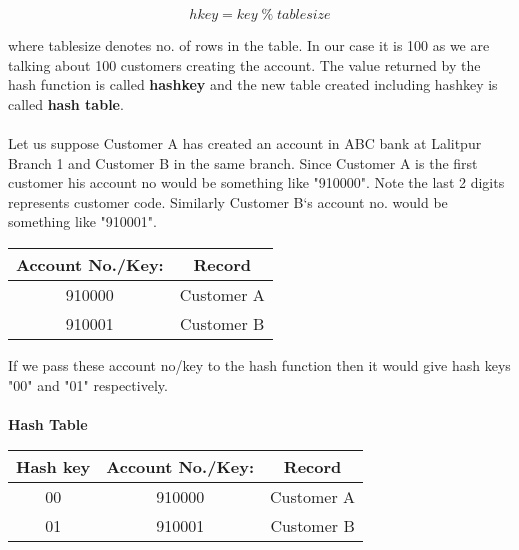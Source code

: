 \documentclass[12pt,a4paper]{article}
\begin{document}
$$ hkey = key \; \% \; tablesize $$

\noindent where tablesize denotes no. of rows in the table. In our case it is 100 as we are talking about 100 customers creating the account. The value returned by the hash function is called \textbf{hashkey} and the new table created including hashkey is called \textbf{hash table}. \\ \\
Let us suppose Customer A has created an account in ABC bank at Lalitpur Branch 1 and Customer B in the same branch. Since Customer A is the first customer his account no would be something like "910000". Note the last 2 digits represents customer code. Similarly Customer B`s account no. would be something like "910001".
\FloatBarrier
\begin{table}[H]

	\centering	
	\begin{tabular}{|c|c|} %

	\hline
	\textbf{Account No./Key:} & \textbf{Record} \\

	\hline
	910000 & Customer A \\
	910001 & Customer B \\
	\hline

	\end{tabular}

\end{table}
\FloatBarrier

\noindent If we pass these account no/key to the hash function then it would give hash keys "00" and "01" respectively. \\ \\
\textbf{Hash Table}

\FloatBarrier
\begin{table}[H]

	\centering	
	\begin{tabular}{|c|c|c|} %

	\hline
	\textbf{Hash key} & \textbf{Account No./Key:} & \textbf{Record} \\

	\hline
	00 & 910000 & Customer A \\
	01 & 910001 & Customer B \\
	\hline

	\end{tabular}

\end{table}
\FloatBarrier
\end{document}
